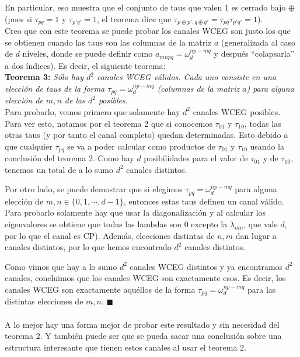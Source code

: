 En particular, eso muestra que el conjunto de taus que valen 1 es cerrado bajo $\oplus$ (pues si $\tau_{pq}= 1$ y $\tau_{p'q'}=1$, el teorema dice que $\tau_{p\oplus p', q\oplus q'} = \tau_{pq} \tau_{p'q'} = 1$).  \\

Creo que con este teorema se puede probar los canales WCEG son justo los que se obtienen cuando las taus son las columnas de la matriz $a$ (generalizada al caso de $d$ niveles, donde se  puede definir como $a_{mnpq} = \omega_{d}^{np-mq}$ y después ``colapsarla'' a dos índices). Es decir, el siguiente teorema:\\

\textbf{Teorema 3:} \textit{Sólo hay $d^2$ canales WCEG válidos. Cada uno consiste en una elección de taus de la forma $\tau_{pq} = \omega_d^{np-mq}$ (columnas de la matriz $a$) para alguna elección de $m,n$ de las $d^2$ posibles.}\\

Para probarlo, vemos primero que solamente hay $d^2$ canales WCEG posibles. Para ver esto, notamos por el teorema 2 que si conocemos $\tau_{01}$ y $\tau_{10}$, todas las otras taus (y por tanto el canal completo) quedan determinadas. Esto debido a que cualquier $\tau_{pq}$ se va a poder calcular como productos de $\tau_{01}$ y $\tau_{10}$ usando la conclusión del teorema 2.  Como hay $d$ posibilidades para el valor de $\tau_{01}$ y de $\tau_{10}$, tenemos un total de a lo sumo  $d^2$ canales distintos. 

Por otro lado, se puede demostrar que si elegimos $\tau_{pq} = \omega_d^{np-mq}$ para alguna elección de $m,n \in \{0,1, \cdots , d-1\}$, entonces estas taus definen un canal válido. Para probarlo solamente hay que usar la diagonalización y al calcular los eigenvalores se obtiene que todas las lambdas son $0$ excepto la $\lambda_{mn}$, que vale $d$, por lo que el canal es CP). Además, elecciones distintas de $n,m$ dan lugar a canales distintos, por lo que hemos encontrado $d^2$ canales distintos. 

Como vimos que hay a lo sumo $d^2$ canales WCEG distintos y ya encontramos $d^2$ canales, concluimos que los canales WCEG son exactamente esos. Es decir, los canales WCEG son exactamente aquéllos de la forma $\tau_{pq}  =\omega_d^{np-mq}$ para las distintas elecciones de $m,n$. $\blacksquare$ \\ \\

A lo mejor hay una forma mejor de probar este resultado y sin necesidad del teorema 2. Y también puede ser que se pueda sacar una conclusión sobre una estructura interesante que tienen estos canales al usar el teorema 2. \\

